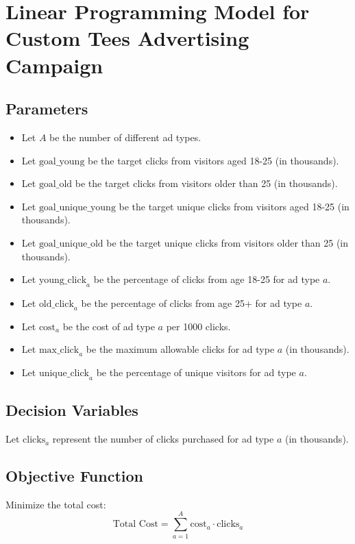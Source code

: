 \documentclass{article}
\begin{document}
\section*{Linear Programming Model for Custom Tees Advertising Campaign}

\subsection*{Parameters}
\begin{itemize}
    \item Let \( A \) be the number of different ad types.
    \item Let \( \text{goal\_young} \) be the target clicks from visitors aged 18-25 (in thousands).
    \item Let \( \text{goal\_old} \) be the target clicks from visitors older than 25 (in thousands).
    \item Let \( \text{goal\_unique\_young} \) be the target unique clicks from visitors aged 18-25 (in thousands).
    \item Let \( \text{goal\_unique\_old} \) be the target unique clicks from visitors older than 25 (in thousands).
    \item Let \( \text{young\_click}_{a} \) be the percentage of clicks from age 18-25 for ad type \( a \).
    \item Let \( \text{old\_click}_{a} \) be the percentage of clicks from age 25+ for ad type \( a \).
    \item Let \( \text{cost}_{a} \) be the cost of ad type \( a \) per 1000 clicks.
    \item Let \( \text{max\_click}_{a} \) be the maximum allowable clicks for ad type \( a \) (in thousands).
    \item Let \( \text{unique\_click}_{a} \) be the percentage of unique visitors for ad type \( a \).
\end{itemize}

\subsection*{Decision Variables}
Let \( \text{clicks}_{a} \) represent the number of clicks purchased for ad type \( a \) (in thousands).

\subsection*{Objective Function}
Minimize the total cost:
\[
\text{Total Cost} = \sum_{a=1}^{A} \text{cost}_{a} \cdot \text{clicks}_{a}
\]
\end{document}
